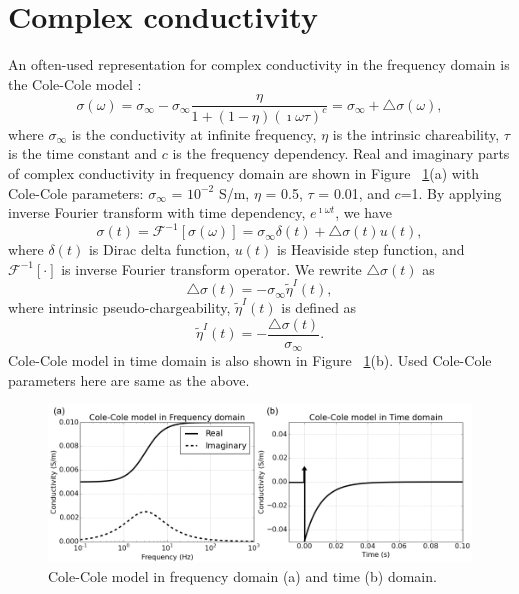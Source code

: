 \documentclass[a4paper, 11pt]{article}
\newcommand{\siginf}{\sigma_\infty}
\newcommand{\dsig}{\triangle\sigma}
\newcommand{\peta}{\tilde{\eta}}
\begin{document}
\section{Complex conductivity}
An often-used representation for complex conductivity in the frequency domain is the Cole-Cole model \cite{COLE}:
\begin{equation}
  \sigma(\omega) = \sigma_{\infty} - \sigma_{\infty}\frac{\eta}{1+(1-\eta)(\imath\omega\tau)^c} = \sigma_{\infty} + \triangle\sigma(\omega),
  \label{eq: sigma_freq}
\end{equation}
where $\sigma_{\infty}$ is the conductivity at infinite frequency, $\eta$ is the intrinsic chareability, $\tau$ is the time constant and $c$ is the frequency dependency. Real and imaginary parts of complex conductivity in frequency domain are shown in Figure ~\ref{Fig:FDandTDCole}(a) with Cole-Cole parameters: $\siginf$ = $10^{-2}$ S/m, $\eta $ = 0.5, $\tau$ = 0.01, and $c$=1. By applying inverse Fourier transform with time dependency, $e^{\imath\omega t}$, we have
\begin{equation}
  \sigma(t) = \mathscr{F}^{-1}[\sigma(\omega)] = \sigma_{\infty}\delta(t) + \triangle\sigma(t)u(t),
  \label{eq: sigma_time}
\end{equation}
where $\delta(t)$ is Dirac delta function, $u(t)$ is Heaviside step function, and $\mathscr{F}^{-1}[\cdot]$ is inverse Fourier transform operator. 
We rewrite $\dsig(t)$ as 
\begin{equation}
  \dsig(t) = - \siginf\peta^{I}(t),
  \label{eq: sigma_time_c1}
\end{equation}
where intrinsic pseudo-chargeability, $\peta^{I}(t)$ is defined as
\begin{equation}
    \peta^{I}(t) = -\frac{\dsig(t)}{\siginf}. %
    \label{eq: intrinsic_peta}
\end{equation}
Cole-Cole model in time domain is also shown in Figure ~\ref{Fig:FDandTDCole}(b). Used Cole-Cole parameters here are same as the above.

\begin{figure}
  \centering
  \includegraphics[width=1.0\textwidth]{figures/FDandTDCole.png}
  \caption{Cole-Cole model in frequency domain (a) and time (b) domain. }
  \label{Fig:FDandTDCole}
\end{figure}
\end{document}
